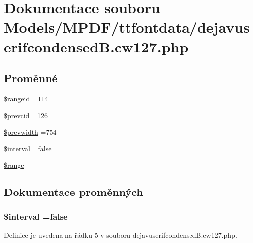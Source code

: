 \hypertarget{dejavuserifcondensed_b_8cw127_8php}{\section{Dokumentace souboru Models/\-M\-P\-D\-F/ttfontdata/dejavuserifcondensed\-B.cw127.\-php}
\label{dejavuserifcondensed_b_8cw127_8php}
}
\subsection*{Proměnné}
\begin{DoxyCompactItemize}
\item 
\hyperlink{dejavuserifcondensed_b_8cw127_8php_a555224809a2d03766193a06c6f4ea061}{\$rangeid} =114
\item 
\hyperlink{dejavuserifcondensed_b_8cw127_8php_af9586406f81f4c60e4f21823e5af1f1d}{\$prevcid} =126
\item 
\hyperlink{dejavuserifcondensed_b_8cw127_8php_afc01c27a4bb149f1386368eb7c57f324}{\$prevwidth} =754
\item 
\hyperlink{dejavuserifcondensed_b_8cw127_8php_a02df6fd14302ba88fecc15b95d513e5b}{\$interval} =\hyperlink{ttfontsuni_8php_afbaa04e5cc97693dc668b3c45d3dd740}{false}
\item 
\hyperlink{dejavuserifcondensed_b_8cw127_8php_ac2e4b5fa63099d7c943a803ae122dd2b}{\$range}
\end{DoxyCompactItemize}


\subsection{Dokumentace proměnných}
\hypertarget{dejavuserifcondensed_b_8cw127_8php_a02df6fd14302ba88fecc15b95d513e5b}{
\subsubsection[{\$interval}]{\setlength{\rightskip}{0pt plus 5cm}\$interval ={\bf false}}}\label{dejavuserifcondensed_b_8cw127_8php_a02df6fd14302ba88fecc15b95d513e5b}


Definice je uvedena na řádku 5 v souboru dejavuserifcondensed\-B.\-cw127.\-php.

